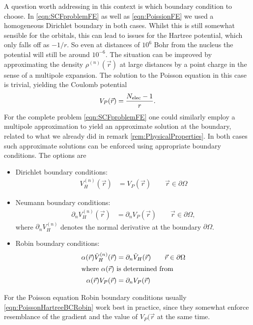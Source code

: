 A question worth addressing in this context is which boundary condition to choose.
In \eqref{eqn:SCFproblemFE} as well as \eqref{eqn:PoissionFE}
we used a  homogeneous Dirichlet boundary in both cases.
Whilst this is still somewhat sensible for the \SCF orbitals,
this can lead to issues for the Hartree potential, which only falls off as $-1/r$.
So even at distances of $10^6$ Bohr from the nucleus the potential
will still be around $10^{-6}$.
The situation can be improved by approximating the density $\rho^{(n)}(\vec{r})$
at large distances by a point charge in the sense of a multipole expansion.
The solution to the Poisson equation in this case is trivial,
yielding the Coulomb potential
\[ V_P(\vec{r}) = \frac{N_\text{elec} -1}{r}. \]
For the complete \SCF problem \eqref{eqn:SCFproblemFE}
one could similarly employ a multipole approximation
to yield an approximate solution at the boundary,
related to what we already did in remark
\vref{rem:PhysicalProperties}.
In both cases such approximate solutions can be enforced
using appropriate boundary conditions.
The options are
\begin{itemize}
	\item Dirichlet boundary conditions:
		\begin{align}
			V_H^{(n)}(\vec{r}) &= V_P(\vec{r}) \qquad \vec{r} \in \partial\Omega
			\label{eqn:PoissonHartreeBCDirichlet}
		\end{align}
	\item Neumann boundary conditions:
		\begin{align}
			\partial_n V_H^{(n)}(\vec{r}) &= \partial_n V_P(\vec{r}) \qquad \vec{r} \in \partial\Omega,
			\label{eqn:PoissonHartreeBCNeumann}
		\end{align}
		where $\partial_n V_H^{(n)}$ denotes the normal derivative at the boundary $\partial\Omega$.
	\item Robin boundary conditions:
		\begin{align}
			\label{eqn:PoissonHartreeBCRobin}
			\alpha(\vec{r}) \tilde{V}_H^{(n)}(\vec{r})
				&= \partial_n \tilde{V}_H(\vec{r}) \qquad \vec{r} \in \partial\Omega \\
		\intertext{where $\alpha(\vec{r})$ is determined from}
			\nonumber
			\alpha(\vec{r}) V_P(\vec{r}) &= \partial_n  V_P(\vec{r}) 
		\end{align}
\end{itemize}
For the Poisson equation Robin boundary conditions usually
\eqref{eqn:PoissonHartreeBCRobin} work best in practice,
since they somewhat enforce resemblance of the gradient and the value
of $V_P(\vec{r}$ at the same time.

